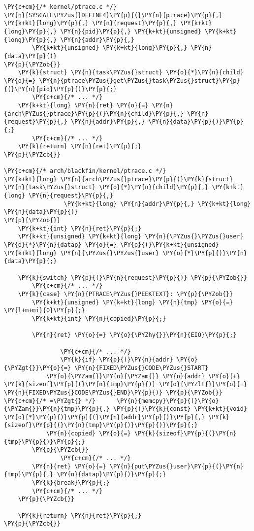 \begin{Verbatim}[commandchars=\\\{\}]
\PY{c+cm}{/* kernel/ptrace.c */}
\PY{n}{SYSCALL\PYZus{}DEFINE4}\PY{p}{(}\PY{n}{ptrace}\PY{p}{,} \PY{k+kt}{long}\PY{p}{,} \PY{n}{request}\PY{p}{,} \PY{k+kt}{long}\PY{p}{,} \PY{n}{pid}\PY{p}{,} \PY{k+kt}{unsigned} \PY{k+kt}{long}\PY{p}{,} \PY{n}{addr}\PY{p}{,}
		\PY{k+kt}{unsigned} \PY{k+kt}{long}\PY{p}{,} \PY{n}{data}\PY{p}{)}
\PY{p}{\PYZob{}}
	\PY{k}{struct} \PY{n}{task\PYZus{}struct} \PY{o}{*}\PY{n}{child} \PY{o}{=} \PY{n}{ptrace\PYZus{}get\PYZus{}task\PYZus{}struct}\PY{p}{(}\PY{n}{pid}\PY{p}{)}\PY{p}{;}
        \PY{c+cm}{/* ... */}
	\PY{k+kt}{long} \PY{n}{ret} \PY{o}{=} \PY{n}{arch\PYZus{}ptrace}\PY{p}{(}\PY{n}{child}\PY{p}{,} \PY{n}{request}\PY{p}{,} \PY{n}{addr}\PY{p}{,} \PY{n}{data}\PY{p}{)}\PY{p}{;}
        \PY{c+cm}{/* ... */}
	\PY{k}{return} \PY{n}{ret}\PY{p}{;}
\PY{p}{\PYZcb{}}

\PY{c+cm}{/* arch/blackfin/kernel/ptrace.c */}
\PY{k+kt}{long} \PY{n}{arch\PYZus{}ptrace}\PY{p}{(}\PY{k}{struct} \PY{n}{task\PYZus{}struct} \PY{o}{*}\PY{n}{child}\PY{p}{,} \PY{k+kt}{long} \PY{n}{request}\PY{p}{,}
                 \PY{k+kt}{long} \PY{n}{addr}\PY{p}{,} \PY{k+kt}{long} \PY{n}{data}\PY{p}{)}
\PY{p}{\PYZob{}}
	\PY{k+kt}{int} \PY{n}{ret}\PY{p}{;}
	\PY{k+kt}{unsigned} \PY{k+kt}{long} \PY{n}{\PYZus{}\PYZus{}user} \PY{o}{*}\PY{n}{datap} \PY{o}{=} \PY{p}{(}\PY{k+kt}{unsigned} \PY{k+kt}{long} \PY{n}{\PYZus{}\PYZus{}user} \PY{o}{*}\PY{p}{)}\PY{n}{data}\PY{p}{;}

	\PY{k}{switch} \PY{p}{(}\PY{n}{request}\PY{p}{)} \PY{p}{\PYZob{}}
        \PY{c+cm}{/* ... */}
	\PY{k}{case} \PY{n}{PTRACE\PYZus{}PEEKTEXT}: \PY{p}{\PYZob{}}
		\PY{k+kt}{unsigned} \PY{k+kt}{long} \PY{n}{tmp} \PY{o}{=} \PY{l+m+mi}{0}\PY{p}{;}
		\PY{k+kt}{int} \PY{n}{copied}\PY{p}{;}

		\PY{n}{ret} \PY{o}{=} \PY{o}{\PYZhy{}}\PY{n}{EIO}\PY{p}{;}

                \PY{c+cm}{/* ... */}
                \PY{k}{if} \PY{p}{(}\PY{n}{addr} \PY{o}{\PYZgt{}}\PY{o}{=} \PY{n}{FIXED\PYZus{}CODE\PYZus{}START}
		    \PY{o}{\PYZam{}}\PY{o}{\PYZam{}} \PY{n}{addr} \PY{o}{+} \PY{k}{sizeof}\PY{p}{(}\PY{n}{tmp}\PY{p}{)} \PY{o}{\PYZlt{}}\PY{o}{=} \PY{n}{FIXED\PYZus{}CODE\PYZus{}END}\PY{p}{)} \PY{p}{\PYZob{}}
\PY{c+cm}{/* =\PYZgt{} */}		\PY{n}{memcpy}\PY{p}{(}\PY{o}{\PYZam{}}\PY{n}{tmp}\PY{p}{,} \PY{p}{(}\PY{k}{const} \PY{k+kt}{void} \PY{o}{*}\PY{p}{)}\PY{p}{(}\PY{n}{addr}\PY{p}{)}\PY{p}{,} \PY{k}{sizeof}\PY{p}{(}\PY{n}{tmp}\PY{p}{)}\PY{p}{)}\PY{p}{;}
			\PY{n}{copied} \PY{o}{=} \PY{k}{sizeof}\PY{p}{(}\PY{n}{tmp}\PY{p}{)}\PY{p}{;}
		\PY{p}{\PYZcb{}}
                \PY{c+cm}{/* ... */}
		\PY{n}{ret} \PY{o}{=} \PY{n}{put\PYZus{}user}\PY{p}{(}\PY{n}{tmp}\PY{p}{,} \PY{n}{datap}\PY{p}{)}\PY{p}{;}
		\PY{k}{break}\PY{p}{;}
        \PY{c+cm}{/* ... */}
	\PY{p}{\PYZcb{}}

	\PY{k}{return} \PY{n}{ret}\PY{p}{;}
\PY{p}{\PYZcb{}}
\end{Verbatim}
